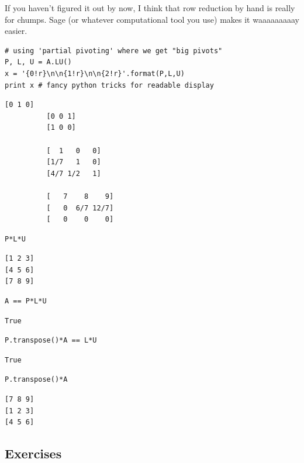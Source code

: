 \documentclass[10pt,]{book}
\theoremstyle{plain}
\numberwithin{equation}{section}
\begin{document}
        If you haven't figured it out by now, I think that row reduction by hand
        is really for chumps. Sage (or whatever computational tool you use) makes
        it waaaaaaaaay easier.
\begin{lstlisting}[style=sageinput]
# using 'partial pivoting' where we get "big pivots"
P, L, U = A.LU()
x = '{0!r}\n\n{1!r}\n\n{2!r}'.format(P,L,U)
print x # fancy python tricks for readable display
\end{lstlisting}
\begin{lstlisting}[style=sageoutput]
          [0 1 0]
          [0 0 1]
          [1 0 0]

          [  1   0   0]
          [1/7   1   0]
          [4/7 1/2   1]

          [   7    8    9]
          [   0  6/7 12/7]
          [   0    0    0]
\end{lstlisting}
\begin{lstlisting}[style=sageinput]
P*L*U
\end{lstlisting}
\begin{lstlisting}[style=sageoutput]
[1 2 3]
[4 5 6]
[7 8 9]
\end{lstlisting}
\begin{lstlisting}[style=sageinput]
A == P*L*U
\end{lstlisting}
\begin{lstlisting}[style=sageoutput]
True
\end{lstlisting}
\begin{lstlisting}[style=sageinput]
P.transpose()*A == L*U
\end{lstlisting}
\begin{lstlisting}[style=sageoutput]
True
\end{lstlisting}
\begin{lstlisting}[style=sageinput]
P.transpose()*A
\end{lstlisting}
\begin{lstlisting}[style=sageoutput]
[7 8 9]
[1 2 3]
[4 5 6]
\end{lstlisting}
\typeout{************************************************}
\typeout{************************************************}
\subsection[Exercises]{Exercises}\label{subsection-55}
\end{document}

